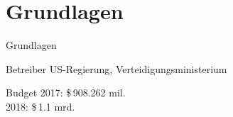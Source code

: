 \section{Grundlagen}
\begin{frame}{Grundlagen}
    \begin{block}{Betreiber}
        US-Regierung, Verteidigungsministerium
    \end{block}
    \begin{block}{Budget}
        2017: \si{\$}\,\num{908.262} mil.\\
        2018: \si{\$}\,\num{1.1} mrd.
    \end{block}
\end{frame}


